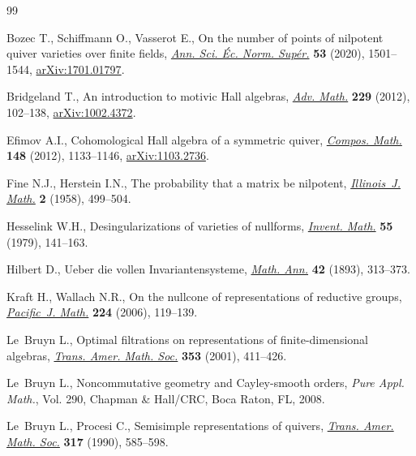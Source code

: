 \documentclass[pdftex]{sigma}
\numberwithin{equation}{section}
\theoremstyle{definition}
\begin{document}
\begin{thebibliography}{99}
\footnotesize\itemsep=0pt

Bozec T., Schiffmann O., Vasserot E., On the number of points of nilpotent
 quiver varieties over finite fields,
 \href{https://doi.org/10.24033/asens.2452}{\textit{Ann. Sci. \'Ec. Norm.
 Sup\'er.}} \textbf{53} (2020), 1501--1544,
 \href{http://arxiv.org/abs/1701.01797}{arXiv:1701.01797}.

Bridgeland T., An introduction to motivic {H}all algebras,
 \href{https://doi.org/10.1016/j.aim.2011.09.003}{\textit{Adv. Math.}}
 \textbf{229} (2012), 102--138,
 \href{http://arxiv.org/abs/1002.4372}{arXiv:1002.4372}.

Efimov A.I., Cohomological {H}all algebra of a symmetric quiver,
 \href{https://doi.org/10.1112/S0010437X12000152}{\textit{Compos. Math.}}
 \textbf{148} (2012), 1133--1146,
 \href{http://arxiv.org/abs/1103.2736}{arXiv:1103.2736}.

Fine N.J., Herstein I.N., The probability that a matrix be nilpotent,
 \href{https://doi.org/10.1215/ijm/1255454112}{\textit{Illinois~J. Math.}}
 \textbf{2} (1958), 499--504.

Hesselink W.H., Desingularizations of varieties of nullforms,
 \href{https://doi.org/10.1007/BF01390087}{\textit{Invent. Math.}} \textbf{55}
 (1979), 141--163.

Hilbert D., Ueber die vollen {I}nvariantensysteme,
 \href{https://doi.org/10.1007/BF01444162}{\textit{Math. Ann.}} \textbf{42}
 (1893), 313--373.

Kraft H., Wallach N.R., On the nullcone of representations of reductive groups,
 \href{https://doi.org/10.2140/pjm.2006.224.119}{\textit{Pacific~J. Math.}}
 \textbf{224} (2006), 119--139.

Le~Bruyn L., Optimal filtrations on representations of finite-dimensional
 algebras, \href{https://doi.org/10.1090/S0002-9947-00-02590-3}{\textit{Trans.
 Amer. Math. Soc.}} \textbf{353} (2001), 411--426.

Le~Bruyn L., Noncommutative geometry and {C}ayley-smooth orders, \textit{Pure
 Appl. Math.}, Vol. 290, Chapman \& Hall/CRC, Boca Raton, FL, 2008.

Le~Bruyn L., Procesi C., Semisimple representations of quivers,
 \href{https://doi.org/10.2307/2001477}{\textit{Trans. Amer. Math. Soc.}}
 \textbf{317} (1990), 585--598.


\end{thebibliography}
\end{document}
